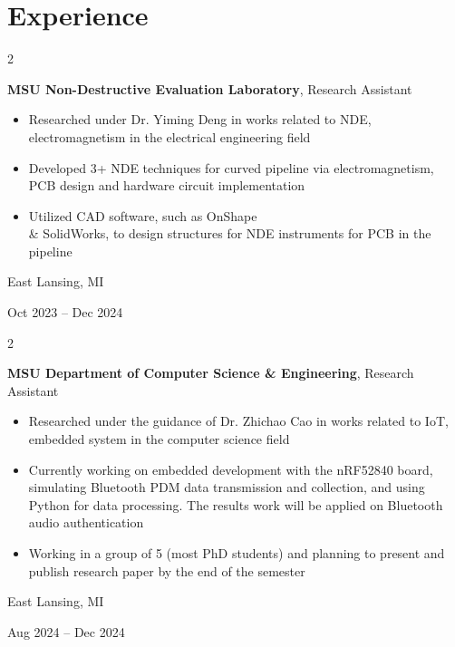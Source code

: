 \documentclass[10pt, letterpaper]{article}
\newenvironment{highlights}{
    \begin{itemize}[
        topsep=0.10 cm,
        parsep=0.10 cm,
        partopsep=0pt,
        itemsep=0pt,
        leftmargin=0.4 cm + 10pt
    ]
}{
    \end{itemize}
} %
\newenvironment{twocolentry}[2][]{
    \onecolentry
    \def\secondColumn{#2}
    \setcolumnwidth{\fill, 4.5 cm}
    \begin{paracol}{2}
}{
    \switchcolumn \raggedleft \secondColumn
    \end{paracol}
    \endonecolentry
} %
\begin{document}
    
    \section{Experience}



        
        \begin{twocolentry}{
            East Lansing, MI

        Oct 2023 – Dec 2024
        }
            \textbf{MSU Non-Destructive Evaluation Laboratory}, Research Assistant
            \begin{highlights}
                \item Researched under Dr. Yiming Deng in works related to NDE, electromagnetism in the electrical engineering field
                \item Developed 3+ NDE techniques for curved pipeline via electromagnetism, PCB design and hardware circuit implementation
                \item Utilized CAD software, such as OnShape \\\& SolidWorks, to design structures for NDE instruments for PCB in the pipeline
            \end{highlights}
        \end{twocolentry}


        \vspace{0.2 cm}

        \begin{twocolentry}{
            East Lansing, MI

        Aug 2024 – Dec 2024
        }
            \textbf{MSU Department of Computer Science \& Engineering}, Research Assistant
            \begin{highlights}
                \item Researched under the guidance of Dr. Zhichao Cao in works related to IoT, embedded system in the computer science field
                \item Currently working on embedded development with the nRF52840 board, simulating Bluetooth PDM data transmission and collection, and using Python for data processing. The results work will be applied on Bluetooth audio authentication
                \item Working in a group of 5 (most PhD students) and planning to present and publish research paper by the end of the semester
            \end{highlights}
        \end{twocolentry}
\end{document}
